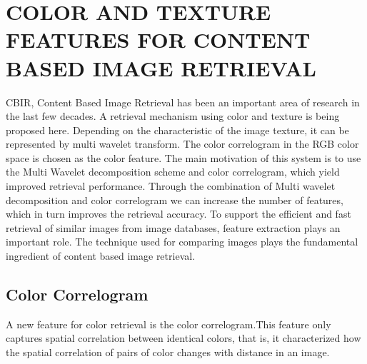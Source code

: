 \section[Color and Texture Features for Content Based Image Retrieval]{\fontsize{14}{12}\selectfont  COLOR AND TEXTURE FEATURES FOR CONTENT BASED IMAGE RETRIEVAL}
CBIR, Content Based Image Retrieval has been an important area of research in the last few
decades. A retrieval mechanism using color and texture is being proposed here. Depending on the characteristic of the image texture, it can be represented by multi wavelet transform. The color correlogram in the RGB color space is chosen as the color feature. The main motivation of this system is to use the Multi Wavelet decomposition scheme and color correlogram, which yield improved retrieval performance. Through the combination of Multi wavelet decomposition and color correlogram we can increase the number of features, which in turn improves the retrieval accuracy. To support the efficient and fast retrieval of similar images from image databases, feature extraction plays an important role. The technique used for comparing images plays the fundamental ingredient of content based image retrieval.

\subsection[Color Correlogram]{Color Correlogram}
A new feature for color retrieval is the color correlogram.This feature only captures spatial
correlation between identical colors, that is, it characterized how the spatial correlation of pairs of color changes with distance in an image.
